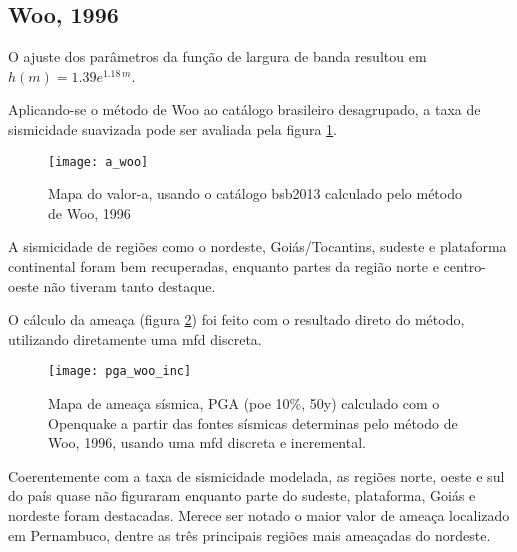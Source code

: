 \subsection{Woo, 1996}
\label{sec:woo_resultados}

O ajuste dos parâmetros da função de largura de banda resultou em $h(m)=1.39e^{1.18\,m}$.

Aplicando-se o método de Woo ao catálogo brasileiro desagrupado, a taxa de sismicidade suavizada 
pode ser avaliada pela figura \ref{fig:a_woo}.

\begin{figure}[H]
  \centering
  \texttt{[image: a\_woo]} 
  \caption{Mapa do valor-a, usando o catálogo \gls{bsb2013} calculado pelo método de Woo, 1996 }
  \label{fig:a_woo} 
\end{figure}

A sismicidade de regiões como o nordeste, Goiás/Tocantins, sudeste e plataforma continental 
foram bem recuperadas, enquanto partes da região norte e centro-oeste não tiveram tanto destaque. 

O cálculo da ameaça (figura \ref{fig:pga_woo_inc}) foi feito com o resultado direto do método, utilizando
diretamente uma \gls{mfd} discreta.
\begin{figure}[H]
  \centering
  \texttt{[image: pga\_woo\_inc]} 
  \caption{Mapa de ameaça sísmica, PGA (poe 10\%, 50y) 
  		   calculado com o Openquake a partir das fontes sísmicas
  		   determinas pelo método de Woo, 1996, usando uma \gls{mfd}
  		   discreta e incremental.
  }
  \label{fig:pga_woo_inc} 
\end{figure}

Coerentemente com a taxa de sismicidade modelada, as regiões norte, oeste e sul do país quase não figuraram 
enquanto parte do sudeste, plataforma, Goiás e nordeste foram destacadas. Merece ser notado o maior valor de ameaça
localizado em Pernambuco, dentre as três principais regiões mais ameaçadas do nordeste.

